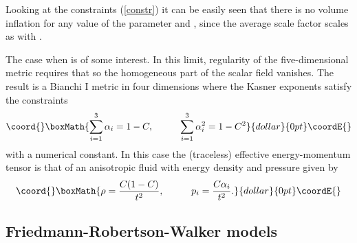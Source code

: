 \documentclass[prd,a4paper,twocolumn,superscriptaddress,nofootinbib,showpacs]{revtex4}
\begin{document}
Looking at the constraints (\ref{constr}) it can be easily seen that there is no volume inflation
for any value of the parameter \coordHE{} and \myHighlight{$\beta$}\coordHE{}, since the average scale factor scales
as \coordHE{} with \coordHE{}.

The case when \coordHE{} is of some interest. In this limit, regularity of the
five-dimensional metric requires that \coordHE{} so the homogeneous
part of the scalar field vanishes. The result is a Bianchi I metric in four dimensions where
the Kasner exponents \coordHE{} satisfy the constraints
$$\coord{}\boxMath{
\sum_{i=1}^3 \alpha_{i}=1-C, \hskip 1cm \sum_{i=1}^3\alpha_{i}^2=1-C^2
}{dollar}{0pt}\coordE{}$$
with \coordHE{} a numerical constant. In this case the (traceless) 
effective energy-momentum tensor is that of an anisotropic fluid with 
energy density and pressure given by
$$\coord{}\boxMath{
\rho={C(1-C)\over t^2}, \hskip 1cm p_{i}={C\alpha_{i}\over t^2}.
}{dollar}{0pt}\coordE{}$$


\subsection{Friedmann-Robertson-Walker models}
\end{document}
